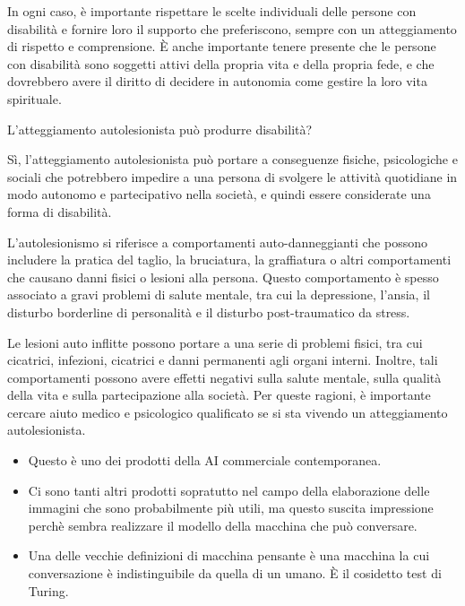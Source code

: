\documentclass[xcolor=svgnames]{beamer}
\begin{document}
\begin{frame}
\begin{description}
In ogni caso, è importante rispettare le scelte individuali delle persone con disabilità e fornire loro il supporto che preferiscono, sempre con un atteggiamento di rispetto e comprensione. È anche importante tenere presente che le persone con disabilità sono soggetti attivi della propria vita e della propria fede, e che dovrebbero avere il diritto di decidere in autonomia come gestire la loro vita spirituale.

\newpage

\item[Giovanni]
L'atteggiamento autolesionista può produrre disabilità? 

\item[chat-GPT] Sì, l'atteggiamento autolesionista può portare a conseguenze fisiche, psicologiche e sociali che potrebbero impedire a una persona di svolgere le attività quotidiane in modo autonomo e partecipativo nella società, e quindi essere considerate una forma di disabilità.

L'autolesionismo si riferisce a comportamenti auto-danneggianti che possono includere la pratica del taglio, la bruciatura, la graffiatura o altri comportamenti che causano danni fisici o lesioni alla persona. Questo comportamento è spesso associato a gravi problemi di salute mentale, tra cui la depressione, l'ansia, il disturbo borderline di personalità e il disturbo post-traumatico da stress.

\tiny Le lesioni auto inflitte possono portare a una serie di problemi fisici, tra cui cicatrici, infezioni, cicatrici e danni permanenti agli organi interni. Inoltre, tali comportamenti possono avere effetti negativi sulla salute mentale, sulla qualità della vita e sulla partecipazione alla società. Per queste ragioni, è importante cercare aiuto medico e psicologico qualificato se si sta vivendo un atteggiamento autolesionista.
\end{description}

\newpage 

\begin{itemize}
    \item Questo è uno dei prodotti della AI commerciale contemporanea.

    \item Ci sono tanti altri prodotti sopratutto nel campo della elaborazione delle immagini che sono probabilmente più utili, ma questo suscita impressione perchè sembra realizzare il modello della macchina che può conversare.

    \item Una delle vecchie definizioni di macchina pensante è una macchina la cui conversazione è indistinguibile da quella di un umano. \`E il cosidetto test di Turing.


\end{itemize}
\end{frame}
\end{document}
